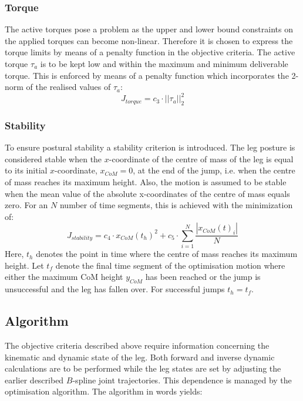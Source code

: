 \documentclass[letterpaper, 10 pt, conference]{ieeeconf}  %
\begin{document}
\subsubsection{Torque}
The active torques pose a problem as the upper and lower bound constraints on the applied torques can become non-linear. Therefore it is chosen to express the torque limits by means of a penalty function in the objective criteria.
The active torque $\tau_a$ is to be kept low and within the maximum and minimum deliverable torque. This is enforced by means of a penalty function which incorporates the 2-norm of the realised values of $\tau_a$:  
 \begin{equation}
J_{torque}= c_3 \cdot || \tau_a ||_2^2
 \end{equation}

\subsubsection{Stability}
To ensure postural stability a stability criterion is introduced. The leg posture is considered stable when the $x$-coordinate of the centre of mass of the leg is equal to its initial $x$-coordinate, $x_{CoM}=0$, at the end of the jump, i.e. when the centre of mass reaches its maximum height. Also, the motion is assumed to be stable when the mean value of the absolute x-coordinates of the centre of mass equals zero. For an $N$ number of time segments, this is achieved with the minimization of:
 \begin{equation}
J_{stability}  = c_4\cdot x_{CoM}(t_h)^2 + c_5\cdot  \sum^{N}_{i=1}\frac{| x_{CoM}(t)_i |}{N}
 \end{equation}
Here, $t_h$ denotes the point in time where the centre of mass reaches its maximum height. Let $t_f$ denote the final time segment of the optimisation motion where either the maximum CoM height $y_{CoM}$ has been reached or the jump is unsuccessful and the leg has fallen over. For successful jumps $t_h=t_f$. \\

\subsection{Algorithm}

The objective criteria described above require information concerning the kinematic and dynamic state of the leg. Both forward and inverse dynamic calculations are to be performed while the leg states are set by adjusting the earlier described $B$-spline joint trajectories. This dependence is managed by the optimisation algorithm. The algorithm in words yields:\\
\end{document}
